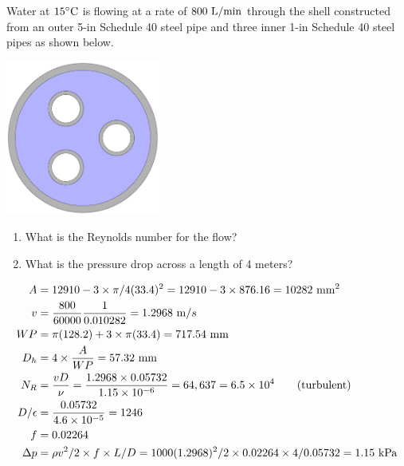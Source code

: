 \documentclass[multi,preview,varwidth=false,border=5,12pt]{standalone}
\begin{document}
\begin{question}
Water at $15^\circ\mathrm{C}$ is flowing at a rate of $800~\rm{L/min}$ through the shell constructed from an outer 5-in Schedule 40 steel pipe and three inner 1-in Schedule 40 steel pipes as shown below.

\includegraphics[width=2in]{imgs/ThreePipeHeatExchanger.pdf}

\begin{enumerate}

\item What is the Reynolds number for the flow?

\item What is the pressure drop across a length of 4 meters?

\end{enumerate}


\begin{solution}
\begin{align*}
    A &= 12910 - 3\times \pi/4(33.4)^2 = 12910 - 3\times 876.16 = 10282~\mathrm{mm}^2\\
    v&= \frac{800}{60000}\frac{1}{0.010282}=1.2968~\mathrm{m}/s\\
    WP &= \pi(128.2) + 3\times \pi(33.4)= 717.54~\mathrm{mm} \\
    D_h &= 4\times\frac{A}{WP}= 57.32~\mathrm{mm} \\
    N_R &=\frac{vD}{\nu} = \frac{1.2968 \times 0.05732}{1.15\times 10^{-6}}=64,637 = 6.5\times 10^4 \qquad{\rm (turbulent)}\\
    D/\epsilon &= \frac{0.05732}{4.6\times 10^{-5}}=1246\\
    f&=0.02264\\
    \Delta p&=\rho v^2/2 \times f \times L/D = 1000 (1.2968)^2/2 \times 0.02264\times 4/0.05732=1.15~\mathrm{kPa}
\end{align*}
\end{solution}

\end{question}
\end{document}
